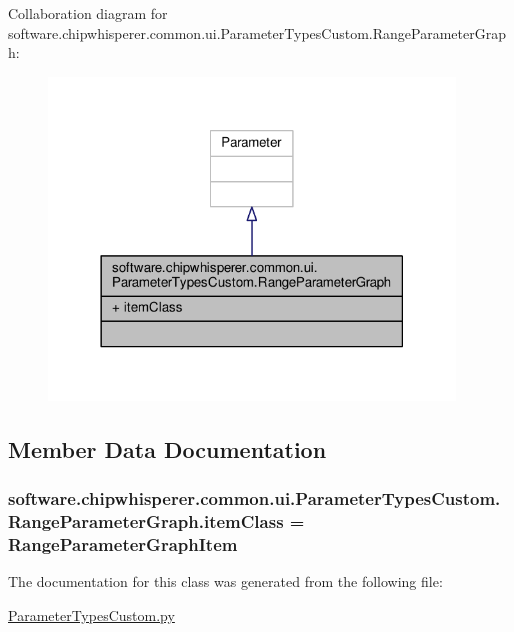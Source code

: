 Collaboration diagram for software.\+chipwhisperer.\+common.\+ui.\+Parameter\+Types\+Custom.\+Range\+Parameter\+Graph\+:\nopagebreak
\begin{figure}[H]
\begin{center}
\leavevmode
\includegraphics[width=306pt]{df/df1/classsoftware_1_1chipwhisperer_1_1common_1_1ui_1_1ParameterTypesCustom_1_1RangeParameterGraph__coll__graph}
\end{center}
\end{figure}


\subsection{Member Data Documentation}
\hypertarget{classsoftware_1_1chipwhisperer_1_1common_1_1ui_1_1ParameterTypesCustom_1_1RangeParameterGraph_a9abfc03cfabedbf2b54faa47bff90af0}{}
\subsubsection[{item\+Class}]{\setlength{\rightskip}{0pt plus 5cm}software.\+chipwhisperer.\+common.\+ui.\+Parameter\+Types\+Custom.\+Range\+Parameter\+Graph.\+item\+Class = {\bf Range\+Parameter\+Graph\+Item}\hspace{0.3cm}{\ttfamily [static]}}\label{classsoftware_1_1chipwhisperer_1_1common_1_1ui_1_1ParameterTypesCustom_1_1RangeParameterGraph_a9abfc03cfabedbf2b54faa47bff90af0}


The documentation for this class was generated from the following file\+:\begin{DoxyCompactItemize}
\item 
\hyperlink{ParameterTypesCustom_8py}{Parameter\+Types\+Custom.\+py}\end{DoxyCompactItemize}

